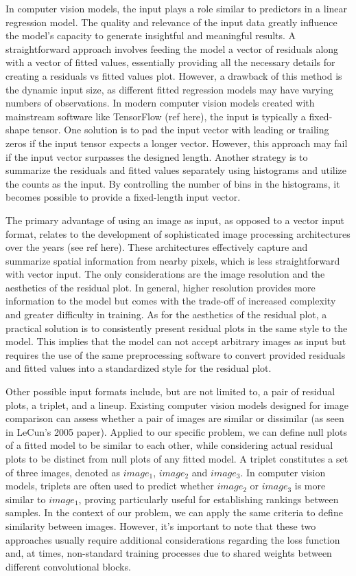 \documentclass[]{interact}
\theoremstyle{plain}%
\theoremstyle{definition}
\theoremstyle{remark}
\begin{document}
In computer vision models, the input plays a role similar to predictors
in a linear regression model. The quality and relevance of the input
data greatly influence the model's capacity to generate insightful and
meaningful results. A straightforward approach involves feeding the
model a vector of residuals along with a vector of fitted values,
essentially providing all the necessary details for creating a residuals
vs fitted values plot. However, a drawback of this method is the dynamic
input size, as different fitted regression models may have varying
numbers of observations. In modern computer vision models created with
mainstream software like TensorFlow (ref here), the input is typically a
fixed-shape tensor. One solution is to pad the input vector with leading
or trailing zeros if the input tensor expects a longer vector. However,
this approach may fail if the input vector surpasses the designed
length. Another strategy is to summarize the residuals and fitted values
separately using histograms and utilize the counts as the input. By
controlling the number of bins in the histograms, it becomes possible to
provide a fixed-length input vector.

The primary advantage of using an image as input, as opposed to a vector
input format, relates to the development of sophisticated image
processing architectures over the years (see ref here). These
architectures effectively capture and summarize spatial information from
nearby pixels, which is less straightforward with vector input. The only
considerations are the image resolution and the aesthetics of the
residual plot. In general, higher resolution provides more information
to the model but comes with the trade-off of increased complexity and
greater difficulty in training. As for the aesthetics of the residual
plot, a practical solution is to consistently present residual plots in
the same style to the model. This implies that the model can not accept
arbitrary images as input but requires the use of the same preprocessing
software to convert provided residuals and fitted values into a
standardized style for the residual plot.

Other possible input formats include, but are not limited to, a pair of
residual plots, a triplet, and a lineup. Existing computer vision models
designed for image comparison can assess whether a pair of images are
similar or dissimilar (as seen in LeCun's 2005 paper). Applied to our
specific problem, we can define null plots of a fitted model to be
similar to each other, while considering actual residual plots to be
distinct from null plots of any fitted model. A triplet constitutes a
set of three images, denoted as \(image_1\), \(image_2\) and
\(image_3\). In computer vision models, triplets are often used to
predict whether \(image_2\) or \(image_3\) is more similar to
\(image_1\), proving particularly useful for establishing rankings
between samples. In the context of our problem, we can apply the same
criteria to define similarity between images. However, it's important to
note that these two approaches usually require additional considerations
regarding the loss function and, at times, non-standard training
processes due to shared weights between different convolutional blocks.
\end{document}
